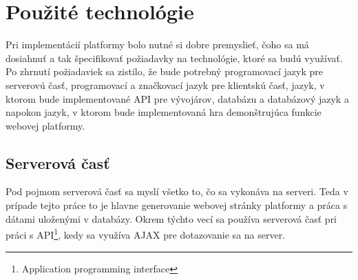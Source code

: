
\chapter{Použité technológie}
\label{chap:technologie}
Pri implementácií platformy bolo nutné si dobre premyslieť, čoho sa má dosiahnuť a tak špecifikovať požiadavky na technológie, ktoré sa budú využívať. Po zhrnutí požiadaviek sa zistilo, že bude potrebný programovací jazyk pre serverovú časť, programovací a značkovací jazyk pre klientskú časť, jazyk, v ktorom bude implementované API pre vývojárov, databázu a databázový jazyk a napokon jazyk, v ktorom bude implementovaná hra demonštrujúca funkcie webovej platformy.

\section{Serverová časť}
\label{sec:server}
Pod pojmom serverová časť sa myslí všetko to, čo sa vykonáva na serveri. Teda v prípade tejto práce to je hlavne generovanie webovej stránky platformy a práca s dátami uloženými v databázy. Okrem týchto vecí sa používa serverová časť pri práci s API\footnote{Application programming interface}, kedy sa využíva AJAX pre dotazovanie sa na server.

